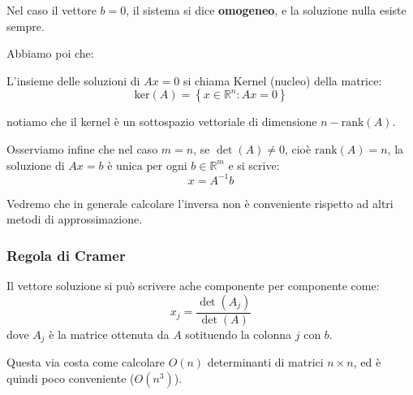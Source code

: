 \documentclass[a4paper,11pt]{article}
\begin{document}
Nel caso il vettore $b = 0$, il sistema si dice \textbf{omogeneo}, e la soluzione nulla esiste sempre.

Abbiamo poi che:
\begin{definition}{}
	L'insieme delle soluzioni di $Ax = 0$ si chiama Kernel (nucleo) della matrice:
	$$
		\mathrm{ker}(A) = \left\{ x \in \mathbb{R}^n : Ax = 0 \right\}
	$$
\end{definition}
notiamo che il kernel è un sottospazio vettoriale di dimensione $n - \mathrm{rank}(A)$.

Osserviamo infine che nel caso $m = n$, se $\det(A) \neq 0$, cioè $\mathrm{rank}(A) = n$, la soluzione di $Ax = b$ è unica per ogni $b \in \mathbb{R}^m$ e si scrive:
$$
x = A^{-1} b
$$

Vedremo che in generale calcolare l'inversa non è conveniente rispetto ad altri metodi di approssimazione.

\subsubsection{Regola di Cramer}
Il vettore soluzione si può scrivere ache componente per componente come:
$$
x_j = \frac{\det(A_j)}{\det(A)}
$$
dove $A_j$ è la matrice ottenuta da $A$ sotituendo la colonna $j$ con $b$.

Questa via costa come calcolare $O(n)$ determinanti di matrici $n \times n$, ed è quindi poco conveniente ($O(n^3)$). 
\end{document}
